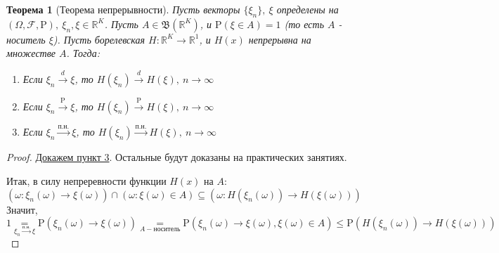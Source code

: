 \documentclass[12pt]{article}
\theoremstyle{basic_theorem}
\newtheorem{theorem}{Теорема}
\theoremstyle{name_theorem}
\def\R{
    \mathbb{R}
}
\def\P{
    \mathrm{P}
}
\def\F{
    \mathcal{F}
}
\def\B{
    \mathfrak{B}
}
\begin{document}
\begin{theorem}[Теорема непрерывности]
    Пусть векторы $\{\xi_n\},\ \xi$ определены на $(\Omega, \F, \P),\ \xi_n,\xi\in\R^K$.
    Пусть $A\in\B(\R^K)$, и $\P(\xi\in A) = 1$ (то есть $A$ - носитель $\xi$).
    Пусть борелевская $H: \R^K\rightarrow\R^1$, и $H(x)$ непрерывна на множестве $A$.
    Тогда:
    \begin{enumerate}
        \item Если $\xi_n\xrightarrow{d}\xi$, то $H(\xi_n)\xrightarrow{d} H(\xi),\ n\rightarrow\infty$
        \item Если $\xi_n\xrightarrow{\P}\xi$, то $H(\xi_n)\xrightarrow{\P} H(\xi),\ n\rightarrow\infty$
        \item Если $\xi_n\xrightarrow{\text{п.н.}}\xi$, то $H(\xi_n)\xrightarrow{\text{п.н.}} H(\xi),\ n\rightarrow\infty$
    \end{enumerate}
\end{theorem}
\begin{proof}
    \underline{Докажем пункт 3}. Остальные будут доказаны на практических занятиях.

    Итак, в силу непреревности функции $H(x)$ на $A$:
    $$(\omega: \xi_n(\omega) \rightarrow\xi(\omega))\cap(\omega:\xi(\omega)\in A)
    \subseteq (\omega: H(\xi_n(\omega)) \rightarrow H(\xi(\omega)))$$
    Значит,
    $$1 \underset{\xi_n\xrightarrow{\text{п.н.}}\xi}{=} \P(\xi_n(\omega) \rightarrow\xi(\omega)) \underset{A-\text{носитель}}{=} \P(\xi_n(\omega)\rightarrow\xi(\omega), \xi(\omega)\in A) \leq \P(H(\xi_n(\omega))\rightarrow H(\xi(\omega)))$$
\end{proof}
\end{document}
